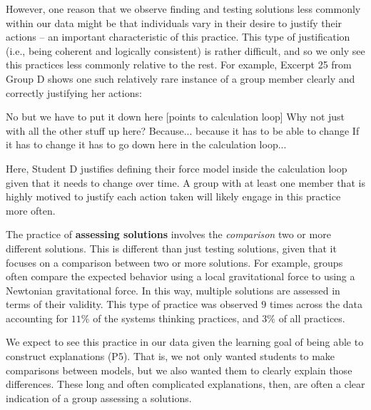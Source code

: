 \documentclass{msuphddissertation}
\begin{document}
\begin{doublespace}
However, one reason that we observe finding and testing solutions less commonly within our data might be that individuals vary in their desire to justify their actions -- an important characteristic of this practice.  This type of justification (i.e., being coherent and logically consistent) is rather difficult, and so we only see this practices less commonly relative to the rest.  For example, Excerpt 25 from Group D shows one such relatively rare instance of a group member clearly and correctly justifying her actions: \begin{description}
\SD No but we have to put it down here [points to calculation loop]
\SA Why not just with all the other stuff {up here}?
\SD Because... because it has to be able to change
\SD If it has to change it has to go down here {in the calculation loop}...
\end{description}  Here, Student D justifies defining their force model inside the calculation loop given that it needs to change over time.  A group with at least one member that is highly motived to justify each action taken will likely engage in this practice more often.  %

%
%
%

The practice of \textbf{assessing solutions} involves the \textit{comparison} two or more different solutions.  This is different than just testing solutions, given that it focuses on a comparison between two or more solutions.  For example, groups often compare the expected behavior using a local gravitational force to using a Newtonian gravitational force.  In this way, multiple solutions are assessed in terms of their validity.   This type of practice was observed $9$ times across the data  accounting for $11\%$ of the systems thinking practices, and $3\%$ of all practices.

We expect to see this practice in our data given the learning goal of being able to construct explanations (P5).  That is, we not only wanted students to make comparisons between models, but we also wanted them to clearly explain those differences.  These long and often complicated explanations, then, are often a clear indication of a group assessing a solutions.  


\end{doublespace}
\end{document}
